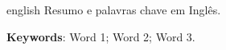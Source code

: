 \begin{resumo}[Abstract]			%
\begin{otherlanguage*}{english}		%
Resumo e palavras chave em Inglês.

\vspace{\onelineskip}
\noindent
\textbf{Keywords}: Word 1; Word 2; Word 3.
\end{otherlanguage*}
\end{resumo}

% 

%  
